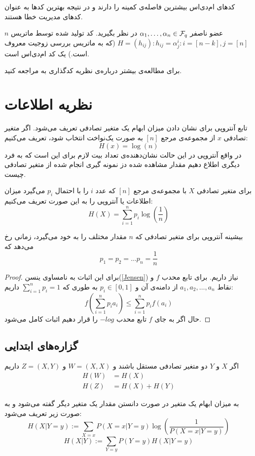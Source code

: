 کدهای ام‌دی‌اس بیشترین فاصله‌ی کمینه را دارند و در نتیجه بهترین کدها به عنوان کدهای مدیریت خطا هستند.
\begin{example}
	$n$
	عضو ناصفر
	$\alpha_1, \ldots, \alpha_n \in \mathcal{F}_q$
	در نظر بگیرید. کد تولید شده توسط ماتریس 
	$H = (h_{ij}): h_{ij} = \alpha_j^i: i = [n - k], j = [n]$
	(که به ماتریس بررسی زوجیت معروف است.) یک کد ام‌دی‌اس است.
\end{example}

	برای مطالعه‌ی بیشتر درباره‌ی نظریه کدگذاری به
\cite{book:coding}
مراجعه کنید.
\section{نظریه اطلاعات}
تابع آنتروپی برای نشان دادن میزان ابهام یک متغیر تصادفی تعریف می‌شود. اگر متغیر تصادفی
$x$
از مجموعه‌ی مرجع
$[n]$
به صورت یک‌نواخت انتخاب شود، تعریف می‌کنیم:
$$H(x) = \log(n)$$
در واقع آنتروپی در این حالت نشان‌دهنده‌ی تعداد بیت لازم برای این است که به فرد دیگری اطلاع دهیم مقدار مشاهده شده دز نمونه گیری انجام شده از متغیر تصادفی چیست. 


\begin{definition}[آنتروپی]
برای متغیر تصادفی
$X$
با مجموعه‌ی مرجع
$[n]$
که عدد
$i$
را با احتمال
$p_i$
می‌گیرد میزان اطلاعات یا آنتروپی را به این صورت تعریف می‌کنیم:
$$H(X) = \sum_{i = 1}^{n} p_i \log(\frac{1}{n})$$
\end{definition}
\begin{theorem}
بیشینه آنتروپی برای متغیر تصادفی که
$n$
مقدار مختلف را به خود می‌گیرد، زمانی رخ می‌دهد که
$$p_1 = p_2 = \dots p_n = \frac{1}{n}$$
\end{theorem}
\begin{proof}
برای این اثبات به نامساوی ینسن(\autoref{Jensen})
 نیاز داریم. برای تابع محدب
$f$
و نقاط
$a_1, a_2, \dots, a_n$
از دامنه‌ی آن و
$p_i \in [0, 1]$
به طوری که
$\sum_{i = 1}^{n} p_i = 1$
داریم:
$$f(\sum_{i = 1}^{n} p_i a_i) \leq \sum_{i = 1}^{n} p_i f(a_i)$$
حال اگر به جای
$f$
تابع محدب
$- log$
را قرار دهیم اثبات کامل می‌شود.
\end{proof}

\subsection{گزاره‌های ابتدایی}
\begin{theorem}
اگر
$X$
و
$Y$
دو متغیر تصادفی مستقل باشند و
$W = (X, X)$
و
$Z = (X, Y)$
داریم
\begin{align*}
    H(W) &= H(X) \\
    H(Z) &= H(X) + H(Y)
\end{align*}
\end{theorem}
\begin{definition}
	به میزان ابهام یک متغیر در صورت دانستن مقدار یک متغیر دیگر گفته می‌شود و به صورت زیر تعریف می‌شود:
$$H(X | Y = y) := \sum_{X = x} P(X = x| Y = y) \log(\frac{1}{P(X = x| Y = y)})$$
$$H(X|Y) := \sum_{Y = y} P(Y = y) H(X | Y = y)$$
\end{definition}

